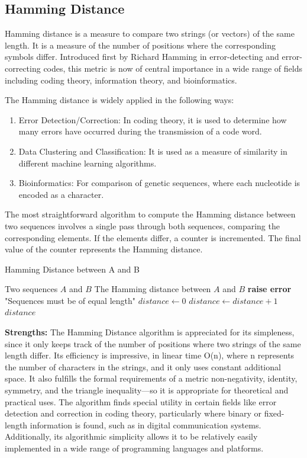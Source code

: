 \documentclass[conference]{IEEEtran}
\begin{document}
\subsection{Hamming Distance}
Hamming distance is a measure to compare two strings (or vectors) of the same length. It is a measure of the number of positions where the corresponding symbols differ. Introduced first by Richard Hamming in error-detecting and error-correcting codes, this metric is now of central importance in a wide range of fields including coding theory, information theory, and bioinformatics.

The Hamming distance is widely applied in the following ways:
\begin{enumerate}
    \item Error Detection/Correction: In coding theory, it is used to determine how many errors have occurred during the transmission of a code word.
    \item Data Clustering and Classification: It is used as a measure of similarity in different machine learning algorithms.
    \item Bioinformatics: For comparison of genetic sequences, where each nucleotide is encoded as a character.
\end{enumerate}

The most straightforward algorithm to compute the Hamming distance between two sequences involves a single pass through both sequences, comparing the corresponding elements. If the elements differ, a counter is incremented. The final value of the counter represents the Hamming distance.
\begin{algorithm}
\caption{Hamming Distance between A and B}
\begin{algorithmic}[1]  %
\Require Two sequences $A$ and $B$
\Ensure The Hamming distance between $A$ and $B$
    \State \textbf{raise error} "Sequences must be of equal length"
\EndIf
\State $distance \gets 0$
        \State $distance \gets distance + 1$
    \EndIf
\EndFor
\State \Return $distance$
\end{algorithmic}
\end{algorithm}

\textbf{Strengths:} The Hamming Distance algorithm is appreciated for its simpleness, since it only keeps track of the number of positions where two strings of the same length differ. Its efficiency is impressive, in linear time O(n), where n represents the number of characters in the strings, and it only uses constant additional space. It also fulfills the formal requirements of a metric non-negativity, identity, symmetry, and the triangle inequality—so it is appropriate for theoretical and practical uses. The algorithm finds special utility in certain fields like error detection and correction in coding theory, particularly where binary or fixed-length information is found, such as in digital communication systems. Additionally, its algorithmic simplicity allows it to be relatively easily implemented in a wide range of programming languages and platforms.
\end{document}
